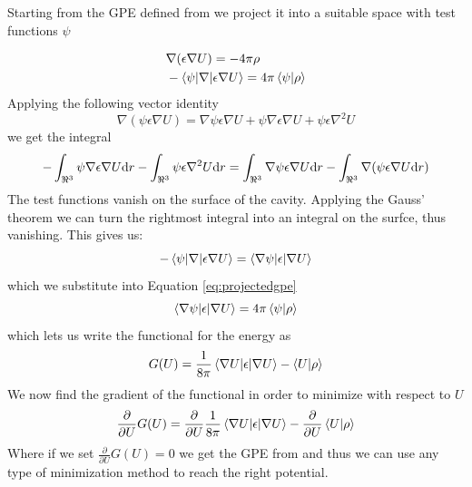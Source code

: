 \documentclass[../master_thesis.tex]{subfiles}
\begin{document}
Starting from the \ac{GPE} defined from \cite{FossoTande:2013ka} we project it
into a suitable space with test functions $\psi$

\begin{align}
  \begin{split}\label{eq:projectedgpe}
    &\nabla (\epsilon\nabla U) = -4\pi\rho\\
    &-\braket{\psi|\nabla |\epsilon\nabla U} = 4\pi \braket{\psi|\rho}
  \end{split}
\end{align}
Applying the following vector identity
\begin{equation}
\nabla (\psi \epsilon\nabla U)=\nabla \psi \epsilon \nabla U +  \psi \nabla \epsilon \nabla U +  \psi \epsilon\nabla^{2} U
\end{equation}
we get the integral
\begin{equation}
  -\int_{\real^3}\psi \nabla \epsilon \nabla U\text{d}r - \int_{\real^3}  \psi\epsilon \nabla^{2} U\text{d}r = \int_{\real^3} \nabla \psi \epsilon \nabla U\text{d}r - \int_{\real^3} \nabla (\psi \epsilon\nabla U\text{d}r)
\end{equation}
The test functions vanish on the surface of the cavity. Applying the Gauss' theorem \cite{Lipparini:2013} we can turn the rightmost integral into
an integral on the surfce, thus vanishing. This gives us:
\begin{equation}
  -\braket{\psi|\nabla|\epsilon\nabla U} = \braket{\nabla \psi |\epsilon | \nabla U}
\end{equation}
which we substitute into Equation \ref{eq:projectedgpe}
\begin{equation}
  \braket{\nabla \psi |\epsilon | \nabla U} =  4\pi \braket{\psi|\rho}
\end{equation}
which lets us write the functional for the energy as \cite{Lipparini:2010bg}
\begin{equation}
  G(U) = \frac{1}{8\pi}  \braket{\nabla U |\epsilon | \nabla U} - \braket{U|\rho}
\end{equation}
We now find the gradient of the functional in order to minimize with respect to $U$
\begin{equation}
  \frac{\partial}{\partial U}G(U) = \frac{\partial}{\partial U}\frac{1}{8\pi}\braket{\nabla U|\epsilon|\nabla U} - \frac{\partial}{\partial U}\braket{U|\rho}
\end{equation}
Where if we set $\frac{\partial}{\partial U}G(U) = 0$ we get the \ac{GPE} from \cite{FossoTande:2013ka}
and thus we can use any type of minimization method to reach the right potential.


\biblio
\end{document}
